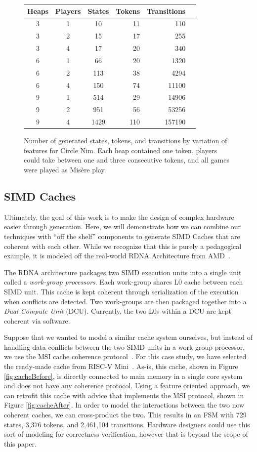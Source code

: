 \documentclass[sigplan,anonymous, review]{acmart}
\begin{document}
\begin{figure}
\small
\begin{tabular}{cccrrr}\toprule
Heaps &Players &States &Tokens &Transitions \\\midrule
3 &1 &10 &11 &110 \\
3 &2 &15 &17 &255 \\
3 &4 &17 &20 &340 \\
6 &1 &66 &20 &1320 \\
6 &2 &113 &38 &4294 \\
6 &4 &150 &74 &11100 \\
9 &1 &514 &29 &14906 \\
9 &2 &951 &56 &53256 \\
9 &4 &1429 &110 &157190 \\
\bottomrule
\end{tabular}
\caption{Number of generated states, tokens, and transitions by variation of features for Circle Nim. Each heap contained one token, players could take between one and three consecutive tokens, and all games were played as Mis\`{e}re play. }\label{tab:circleNim}
\end{figure}

\subsection{SIMD Caches}\label{sec:cache}
Ultimately, the goal of this work is to make the design of complex hardware easier through generation. Here, we will demonstrate how we can combine our techniques with ``off the shelf'' components to generate SIMD Caches that are coherent with each other. While we recognize that this is purely a pedagogical example, it is modeled off the real-world RDNA Architecture from AMD~\cite{AMD:19}.

The RDNA architecture packages two SIMD execution units into a single unit called a \textit{work-group processors}. Each work-group shares L0 cache between each SIMD unit. This cache is kept coherent through serialization of the execution when conflicts are detected. Two work-groups are then packaged together into a \textit{Dual Compute Unit} (DCU). Currently, the two L0s within a DCU are kept coherent via software. 

Suppose that we wanted to model a similar cache system ourselves, but instead of handling data conflicts between the two SIMD units in a work-group processor, we use the MSI cache coherence protocol~\cite{Good83}. For this case study, we have selected the ready-made cache from RISC-V Mini~\cite{Kim:22}. As-is, this cache, shown in Figure \ref{fig:cacheBefore}, is directly connected to main memory in a single core system and does not have any coherence protocol. Using a feature oriented approach, we can retrofit this cache with advice that implements the MSI protocol, shown in Figure \ref{fig:cacheAfter}. In order to model the interactions between the two now coherent caches, we can cross-product the two. This results in an FSM with 729 states, 3,376 tokens, and 2,461,104 transitions. Hardware designers could use this sort of modeling for correctness verification, however that is beyond the scope of this paper.
\end{document}
